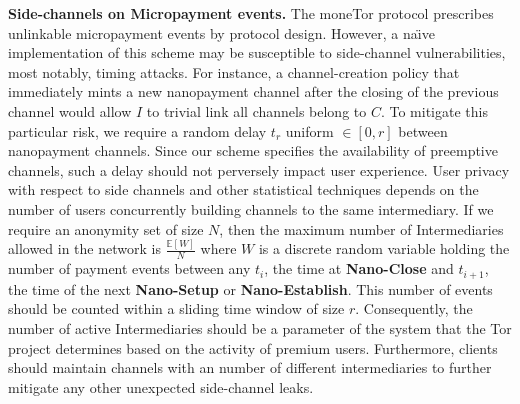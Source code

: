 
\medskip
\noindent\textbf{Side-channels on Micropayment events.}
The moneTor protocol prescribes unlinkable micropayment events by protocol
design. However, a na\"{\i}ve implementation of this scheme may be susceptible to
side-channel vulnerabilities, most notably, timing attacks. For instance, a
channel-creation policy that immediately mints a new nanopayment channel after
the closing of the previous channel would allow $I$ to trivial link all channels
belong to $C$. To mitigate this particular risk, we require a random delay $t_r$
uniform $\in [0, r]$
between nanopayment channels. Since our scheme specifies the availability of
preemptive channels, such a delay should not perversely impact user experience.
User privacy with respect to side channels and other statistical techniques
depends on the number of users concurrently building channels to the same
intermediary. If we require an anonymity set of size $N$, then the maximum
number of Intermediaries allowed in the network is $\frac{\mathbb{E}[W]}{N}$
where $W$ is a discrete random variable holding the number of payment events
between any $t_i$, the time at \textbf{Nano-Close} and $t_{i+1}$, the time of
the next \textbf{Nano-Setup} or \textbf{Nano-Establish}. This number of events
should be counted within a sliding time window of size $r$. Consequently, the
number of active Intermediaries should be a parameter of the system that the Tor
project determines based on the activity of premium users. Furthermore, clients
should maintain channels with an number of different intermediaries to further
mitigate any other unexpected side-channel leaks.


